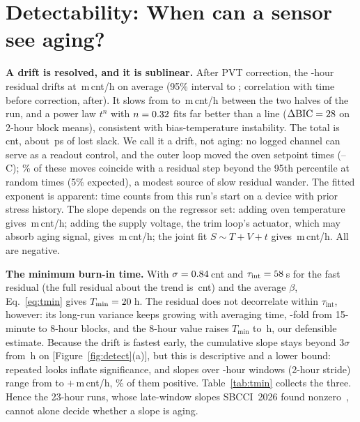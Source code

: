 \documentclass[10pt,twocolumn]{article}
\newcommand{\Tmin}{T_{\min}}
\newcommand{\tint}{\tau_{\mathrm{int}}}
\newcommand{\degC}{\,\textdegree C}
\newcommand{\mcnth}{\,m\,cnt/h}
\begin{document}
\section{Detectability: When can a sensor see aging?}

\textbf{A drift is resolved, and it is sublinear.} After PVT correction, the \vDurRCA-hour residual drifts at \vBetaRCA\mcnth{} on average (95\% interval \vBetaLoRCA{} to \vBetaHiRCA; correlation with time \vRCAcorrStRaw{} before correction, \vRCAcorrStCorr{} after). It slows from \vRCAfirstHalf{} to \vRCAsecondHalf\mcnth{} between the two halves of the run, and a power law $t^{n}$ with $n=0.32$ fits far better than a line ($\Delta\mathrm{BIC}=28$ on 2-hour block means), consistent with bias-temperature instability. The total is \vRCAdriftCnt\,cnt, about \vRCAdriftPs\,ps of lost slack. We call it a drift, not aging: no logged channel can serve as a readout control, and the outer loop moved the oven setpoint \vRCAspChanges{} times (\vRCAspMin--\vRCAspMax\degC); \vSPjumpFrac\% of these moves coincide with a residual step beyond the 95th percentile at random times (5\% expected), a modest source of slow residual wander. The fitted exponent is apparent: time counts from this run's start on a device with prior stress history. The slope depends on the regressor set: adding oven temperature gives \vBetaRegOven\mcnth; adding the supply voltage, the trim loop's actuator, which may absorb aging signal, gives \vBetaRegPsu\mcnth; the joint fit $S\sim T+V+t$ gives \vBetaJoint\mcnth. All are negative.

\textbf{The minimum burn-in time.} With $\sigma=0.84$\,cnt and $\tint=\vTauRCA$\,s for the fast residual (the full residual about the trend is \vSigFullRCA\,cnt) and the average $\beta$, Eq.~\eqref{eq:tmin} gives $\Tmin=\vTminBound$\,h. The residual does not decorrelate within $\tint$, however: its long-run variance keeps growing with averaging time, \vRCAlrvGrowth-fold from 15-minute to 8-hour blocks, and the 8-hour value raises $\Tmin$ to \vTminLrv\,h, our defensible estimate. Because the drift is fastest early, the cumulative slope stays beyond 3$\sigma$ from \vTminSeq\,h on [Figure~\ref{fig:detect}(a)], but this is descriptive and a lower bound: repeated looks inflate significance, and slopes over \vWinLen-hour windows (2-hour stride) range from \vWinSlopeMin{} to $+$\vWinSlopeMax\mcnth, \vWinPosPct\% of them positive. Table~\ref{tab:tmin} collects the three. Hence the 23-hour runs, whose late-window slopes SBCCI~2026 found nonzero~\cite{sbcci26}, cannot alone decide whether a slope is aging.
\end{document}
